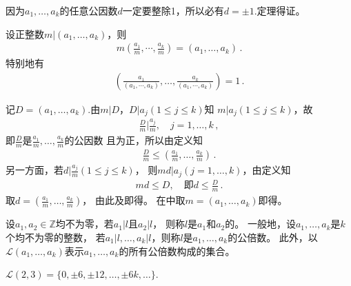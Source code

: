 \begin{prove}
    因为$a_1,\ldots,a_k$的任意公因数$d$一定要整除1，所以必有$d=\pm1$.定理得证。
\end{prove}
\begin{theorem}\label{theorem:7.ex02.8}
    设正整数$m|(a_1,\ldots,a_k)$，则
    \begin{align}\label{eq:7.ex02.prove-theorem8-01}
        m\left(\frac{a_1}{m},\cdots,\frac{a_k}{m}\right)=(a_1,\ldots,a_k)\, .
    \end{align}
    特别地有
    \begin{align}\label{eq:7.ex02.prove-theorem8-02}
        \left(\frac{a_1}{(a_1,\cdots,a_k)},\ldots,\frac{a_k}{(a_1,\cdots,a_k)}\right)=1\, .
    \end{align}
\end{theorem}
\begin{prove}
    记$D=(a_1,\ldots,a_k)$.由$m|D$，$D|a_j(1\le j \le k)$知
    $m|a_j(1\le j \le k)$，故
    \begin{align}
        \frac{D}{m}\bigg|\frac{a_j}{m},\quad j=1,\ldots,k\, ,
    \end{align}
    即$\displaystyle\frac{D}{m}$是$\displaystyle\frac{a_1}{m},\ldots,\frac{a_k}{m}$的公因数
    且为正，所以由定义知
    \begin{align}\label{eq:7.ex02.prove-theorem8-03}
        \frac{D}{m}\le\left(\frac{a_1}{m},\ldots,\frac{a_k}{m}\right)\, .
    \end{align}
    另一方面，若$\displaystyle d\bigg|\frac{a_j}{m}(1\le j\le k)$，
    则$md|a_j(j=1,\ldots,k)$，由定义知
    \begin{align}
        md\le D,\quad \text{即}d\le\frac{D}{m}\, .
    \end{align}
    取$d=\displaystyle\left(\frac{a_1}{m},\ldots,\frac{a_k}{m}\right)$，
    由此及即得。
    在中取$m=(a_1,\ldots,a_k)$即得。
\end{prove}
\begin{definition}
    设$a_1,a_2\in\mathbb{Z}$均不为零，若$a_1|l$且$a_2|l$，
    则称$l$是$a_1$和$a_2$的。
    一般地，设$a_1,\ldots,a_k$是$k$个均不为零的整数，
    若$a_1|l,\ldots,a_k|l$，则称$l$是$a_1,\ldots,a_k$的公倍数。
    此外，以$\mathcal{L}(a_1,\ldots,a_k)$表示$a_1,\ldots,a_k$的所有公倍数构成的集合。
\end{definition}
\begin{example}
    $\mathcal{L}(2,3)=\{0,\pm6,\pm12,\ldots,\pm6k,\ldots\}$.
\end{example}
